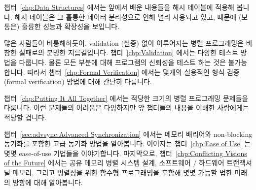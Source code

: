 챕터~\ref{chp:Data Structures} 에서는 앞에서 배운 내용들을 해시 테이블에 적용해
봅니다. 해시 테이블은 그 훌륭한 데이터 분리성으로 인해 널리 사용되고 있고,
때문에 (보통은) 훌륭한 성능과 확장성을 보입니다.

\iffalse
Chapter~\ref{chp:Data Structures} applies the lessons of previous
chapters to hash tables, which are heavily used due
to their excellent partitionability, which (usually) leads to excellent
performance and scalability.
\fi

많은 사람들이 비통해하듯이, validation (실증) 없이 이루어지는 병렬 프로그래밍은
비참한 실패로의 분명한 지름길입니다.
챕터~\ref{chp:Validation} 에서는 다양한 테스트 방법을 다룹니다.
물론 모든 부분에 대해 프로그램의 신뢰성을 테스트 하는 것은 불가능합니다.
따라서 챕터~\ref{chp:Formal Verification} 에서는 몇개의 실용적인 형식
검증 (formal verification) 방법에 대해 간단히 다룹니다.

\iffalse
As many have learned to their sorrow, parallel programming without
validation is a sure path to abject failure.
Chapter~\ref{chp:Validation} covers various forms of testing.
It is of course impossible to test reliability into your program
after the fact, so Chapter~\ref{chp:Formal Verification}
follows up with a brief overview of a couple of practical approaches to
formal verification.
\fi

챕터~\ref{chp:Putting It All Together} 에서는 적당한 크기의 병렬 프로그래밍
문제들을 다룹니다.
이런 문제들의 어려움은 다양하지만 앞 챕터들의 내용을 이해한 사람에게는 적당할
겁니다.

\iffalse
Chapter~\ref{chp:Putting It All Together}
contains a series of moderate-sized parallel programming problems.
The difficulty of these problems vary, but should be appropriate for
someone who has mastered the material in the previous chapters.
\fi

챕터~\ref{sec:advsync:Advanced Synchronization} 에서는 메모리 배리어와
non-blocking 동기화를 포함한 고급 동기화 방법을 알아봅니다.
이어지는 챕터~\ref{chp:Ease of Use} 는 몇몇 ease-of-use 기법들을 이야기합니다.
마지막으로, 챕터~\ref{chp:Conflicting Visions of the Future} 에서는 공유 메모리
병렬 시스템 설계, 소프트웨어 / 하드웨어 트랜잭셔널 메모리, 그리고 병렬성을 위한
함수형 프로그래밍을 포함해 몇몇 가능할 법한 미래의 방향에 대해 알아봅니다.

\iffalse
Chapter~\ref{sec:advsync:Advanced Synchronization}
looks at advanced synchronization methods, including memory barriers
and non-blocking synchronization, while
Chapter~\ref{chp:Parallel Real-Time Computing}
looks at the nascent field of parallel real-time computing.
Chapter~\ref{chp:Ease of Use} follows up with some ease-of-use advice.
Finally, Chapter~\ref{chp:Conflicting Visions of the Future}
looks at a few possible future directions, including
shared-memory parallel system design, software and hardware transactional
memory, and functional programming for parallelism.
\fi

